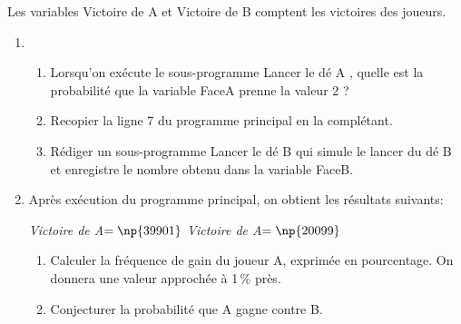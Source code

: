 Les variables Victoire de A et Victoire de B comptent les victoires des joueurs.

\begin{enumerate}[resume]
\item 
	\begin{enumerate}
		\item Lorsqu'on exécute le sous-programme \og Lancer le dé A \fg, quelle est la probabilité que la variable FaceA prenne la valeur 2 ?
		\item Recopier la ligne 7 du programme principal en la complétant.
		\item Rédiger un sous-programme \og Lancer le dé B \fg{} qui simule le lancer du dé B et enregistre le nombre obtenu dans la variable FaceB.
	\end{enumerate}
\item  Après exécution du programme principal, on obtient les résultats suivants:
	
\emph{Victoire de A}$ = \np{39901}$ \qquad  \emph{Victoire de A}$ = \np{20099}$
	\begin{enumerate}
		\item Calculer la fréquence de gain du joueur A, exprimée en pourcentage. On donnera une valeur approchée à 1\,\% près.
		\item Conjecturer la probabilité que A gagne contre B.
	\end{enumerate}
\end{enumerate}
